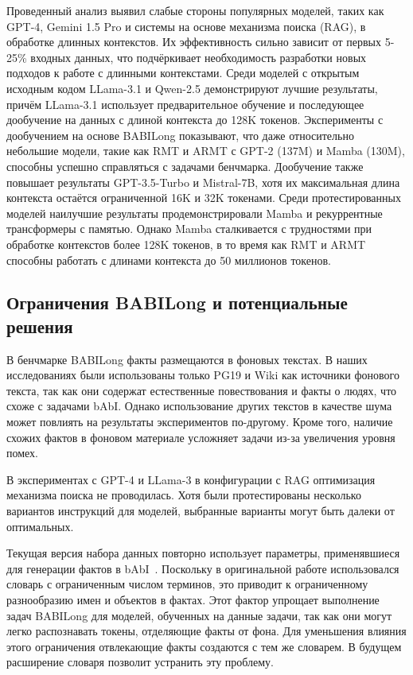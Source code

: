 Проведенный анализ выявил слабые стороны популярных моделей, таких как GPT-4, Gemini 1.5 Pro и системы на основе механизма поиска (RAG), в обработке длинных контекстов. Их эффективность сильно зависит от первых 5-25\% входных данных, что подчёркивает необходимость разработки новых подходов к работе с длинными контекстами. Среди моделей с открытым исходным кодом LLama-3.1 и Qwen-2.5 демонстрируют лучшие результаты, причём LLama-3.1 использует предварительное обучение и последующее дообучение на данных с длиной контекста до 128K токенов. Эксперименты с дообучением на основе BABILong показывают, что даже относительно небольшие модели, такие как RMT и ARMT с GPT-2 (137M) и Mamba (130M), способны успешно справляться с задачами бенчмарка. Дообучение также повышает результаты GPT-3.5-Turbo и Mistral-7B, хотя их максимальная длина контекста остаётся ограниченной 16K и 32K токенами. Среди протестированных моделей наилучшие результаты продемонстрировали Mamba и рекуррентные трансформеры с памятью. Однако Mamba сталкивается с трудностями при обработке контекстов более 128K токенов, в то время как RMT и ARMT способны работать с длинами контекста до 50 миллионов токенов.

\subsection*{Ограничения BABILong и потенциальные решения}
\label{sec:limitations}

В бенчмарке BABILong факты размещаются в фоновых текстах. В наших исследованиях были использованы только PG19 и Wiki как источники фонового текста, так как они содержат естественные повествования и факты о людях, что схоже с задачами bAbI. Однако использование других текстов в качестве шума может повлиять на результаты экспериментов по-другому. Кроме того, наличие схожих фактов в фоновом материале усложняет задачи из-за увеличения уровня помех.

В экспериментах с GPT-4 и LLama-3 в конфигурации с RAG оптимизация механизма поиска не проводилась. Хотя были протестированы несколько вариантов инструкций для моделей, выбранные варианты могут быть далеки от оптимальных. %

Текущая версия набора данных повторно использует параметры, применявшиеся для генерации фактов в bAbI~\cite{WestonBCM15}. Поскольку в оригинальной работе использовался словарь с ограниченным числом терминов, это приводит к ограниченному разнообразию имен и объектов в фактах. Этот фактор упрощает выполнение задач BABILong для моделей, обученных на данные задачи, так как они могут легко распознавать токены, отделяющие факты от фона. Для уменьшения влияния этого ограничения отвлекающие факты создаются с тем же словарем. В будущем расширение словаря позволит устранить эту проблему.


